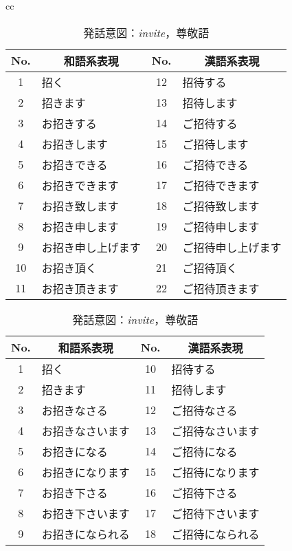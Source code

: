 \begin{table}[htbp]
\begin{center}
{ \scriptsize
\begin{tabular}{cc}
\begin{minipage}[t]{0.5\hsize}
\begin{center}


\caption{発話意図：{\it invite}，謙譲語} 
\label{tbl2:table4.1} 
\begin{tabular}{|c||l|c||l|} 
\hline 
No. & \multicolumn{1}{|c|}{和語系表現} & No. & \multicolumn{1}{|c|}{漢語系表現} \\
\hline 
1&	招く&			12&	招待する \\
\hline 
2&	招きます&		13&	招待します \\
\hline 
3&	お招きする&		14&	ご招待する \\
\hline 
4&	お招きします&		15&	ご招待します \\
\hline 
5&	お招きできる&		16&	ご招待できる \\
\hline 
6&	お招きできます&		17&	ご招待できます \\
\hline 
7&	お招き致します&		18&	ご招待致します \\
\hline 
8&	お招き申します&		19&	ご招待申します \\
\hline 
9&	お招き申し上げます&	20&	ご招待申し上げます \\
\hline 
10&	お招き頂く&		21&	ご招待頂く \\
\hline 
11&	お招き頂きます&		22&	ご招待頂きます \\
\hline 
\end{tabular} 

\end{center}
\end{minipage}
\begin{minipage}[t]{0.5\hsize}
\begin{center}


\caption{発話意図：{\it invite}，尊敬語} 
\label{tbl2:table4.2} 
\begin{tabular}{|c||l|c||l|} 
\hline 
No. & \multicolumn{1}{|c|}{和語系表現} & No. & \multicolumn{1}{|c|}{漢語系表現} \\
\hline 
1&	招く&			10&	招待する \\
\hline 
2&	招きます&		11&	招待します\\
\hline 
3&	お招きなさる&		12&	ご招待なさる\\
\hline 
4&	お招きなさいます&	13&	ご招待なさいます\\
\hline 
5&	お招きになる&		14&	ご招待になる\\
\hline 
6&	お招きになります&	15&	ご招待になります\\
\hline 
7&	お招き下さる&		16&	ご招待下さる\\
\hline 
8&	お招き下さいます&	17&	ご招待下さいます\\
\hline 
9&	お招きになられる&	18&	ご招待になられる\\
\hline 
\end{tabular} 


\end{center}
\end{minipage}
\end{tabular}}
\end{center}
\end{table}
